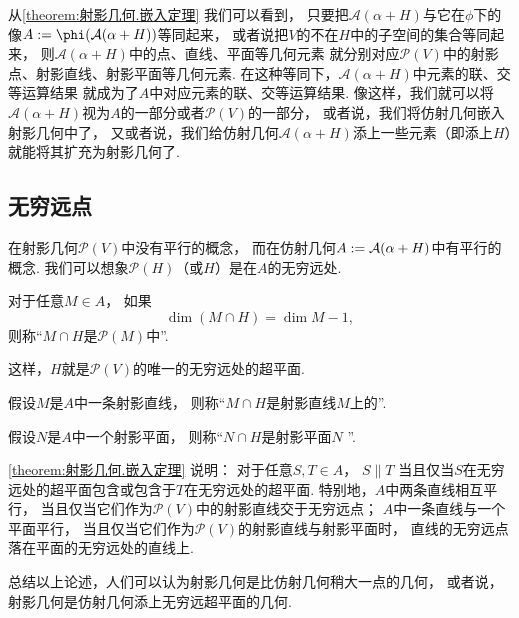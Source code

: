 \begin{remark}
从\cref{theorem:射影几何.嵌入定理} 我们可以看到，
只要把\(\mathcal{A}(\alpha + H)\)与它在\(\phi\)下的像\(A \defeq \phi(\mathcal{A}(\alpha + H))\)等同起来，
或者说把\(V\)的不在\(H\)中的子空间的集合等同起来，
则\(\mathcal{A}(\alpha + H)\)中的点、直线、平面等几何元素
就分别对应\(\mathcal{P}(V)\)中的射影点、射影直线、射影平面等几何元素.
在这种等同下，\(\mathcal{A}(\alpha + H)\)中元素的联、交等运算结果
就成为了\(A\)中对应元素的联、交等运算结果.
像这样，我们就可以将\(\mathcal{A}(\alpha + H)\)视为\(A\)的一部分或者\(\mathcal{P}(V)\)的一部分，
或者说，我们将仿射几何嵌入射影几何中了，
又或者说，我们给仿射几何\(\mathcal{A}(\alpha + H)\)添上一些元素（即添上\(H\)）就能将其扩充为射影几何了.
\end{remark}

\subsection{无穷远点}
在射影几何\(\mathcal{P}(V)\)中没有平行的概念，
而在仿射几何\(A := \mathcal{A}(\alpha + H)\)中有平行的概念.
我们可以想象\(\mathcal{P}(H)\)（或\(H\)）是在\(A\)的无穷远处.

对于任意\(M \in A\)，
如果\begin{equation*}
	\dim(M \cap H) = \dim M - 1,
\end{equation*}
则称“\(M \cap H\)是\(\mathcal{P}(M)\)中”.

这样，\(H\)就是\(\mathcal{P}(V)\)的唯一的无穷远处的超平面.

假设\(M\)是\(A\)中一条射影直线，
则称“\(M \cap H\)是射影直线\(M\)上的”.

假设\(N\)是\(A\)中一个射影平面，
则称“\(N \cap H\)是射影平面\(N\) ”.

\cref{theorem:射影几何.嵌入定理} 说明：
对于任意\(S,T \in A\)，
\(S \parallel T\)
当且仅当\(S\)在无穷远处的超平面包含或包含于\(T\)在无穷远处的超平面.
特别地，\(A\)中两条直线相互平行，
当且仅当它们作为\(\mathcal{P}(V)\)中的射影直线交于无穷远点；
\(A\)中一条直线与一个平面平行，
当且仅当它们作为\(\mathcal{P}(V)\)的射影直线与射影平面时，
直线的无穷远点落在平面的无穷远处的直线上.

总结以上论述，人们可以认为射影几何是比仿射几何稍大一点的几何，
或者说，射影几何是仿射几何添上无穷远超平面的几何.



